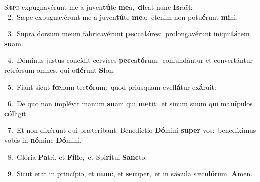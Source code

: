 \lettrine{\initial\textcolor{\initialcolor}{S}}{æpe} expugnavérunt me a juven\-\textbf{tú}\-te \textbf{me}\-a,~\star \textbf{di}\-cat nunc \textbf{Is}\-raël:\\
{\numbfont\textcolor{\numbcolor}{~2.}}~Sæpe expugnavérunt me a juven\-\textbf{tú}\-te \textbf{me}\-a:~\star étenim non potu\-\textbf{é}\-runt \textbf{mi}\-hi.\par
{\numbfont\textcolor{\numbcolor}{~3.}}~Supra dorsum meum fabricavérunt \textbf{pec}\-ca\-\textbf{tó}\-res:~\star prolongavérunt iniqui\-\textbf{tá}\-tem \textbf{su}\-am.\par
{\numbfont\textcolor{\numbcolor}{~4.}}~Dóminus justus concídit cervíces \textbf{pec}\-ca\-\textbf{tó}\-rum:~\star confundántur et convertántur retrórsum omnes, qui o\-\textbf{dé}\-runt \textbf{Si}\-on.\par
{\numbfont\textcolor{\numbcolor}{~5.}}~Fiant sicut \textbf{fœ}\-num tec\-\textbf{tó}\-rum:~\star quod priúsquam evel\-\textbf{lá}\-tur ex\-\textbf{á}\-ruit:\par
{\numbfont\textcolor{\numbcolor}{~6.}}~De quo non implévit manum \textbf{su}\-am qui \textbf{me}\-tit:~\star et sinum suum qui ma\-\textbf{ní}\-pulos \textbf{cól}\-ligit.\par
{\numbfont\textcolor{\numbcolor}{~7.}}~Et non dixérunt qui præteríbant: Benedíctio \textbf{Dó}\-mini \textbf{su}\-\textbf{per} vos:~\star benedíximus vobis in \textbf{nó}\-mine \textbf{Dó}\-mini.\par
{\numbfont\textcolor{\numbcolor}{~8.}}~Glória \textbf{Pa}\-tri, et \textbf{Fí}\-\textbf{li}o,~\star et Spi\-\textbf{rí}\-tui \textbf{Sanc}\-to.\par
{\numbfont\textcolor{\numbcolor}{~9.}}~Sicut erat in princípio, et \textbf{nunc}\-, et \textbf{sem}\-per,~\star et in sǽcula sæcu\-\textbf{ló}\-rum. \textbf{A}\-men.\par
